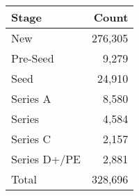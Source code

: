 \begin{tabular}{lr} \toprule
Stage             & Count     \\ \midrule
New               & 276,305   \\
Pre-Seed          & 9,279     \\
Seed              & 24,910    \\
Series A          & 8,580     \\
Series            & 4,584     \\
Series C          & 2,157     \\
Series D+/PE      & 2,881     \\ \midrule
Total             & 328,696   \\
\bottomrule \end{tabular}
